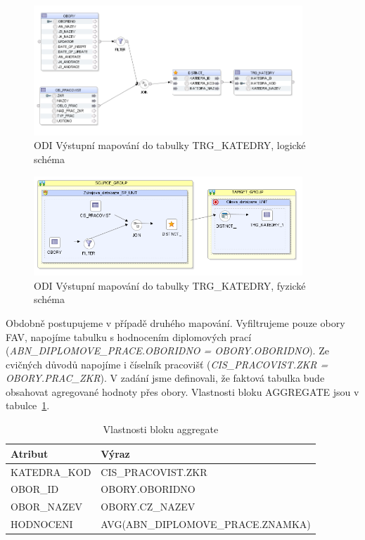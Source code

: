 \begin{figure}[htb]
    \centering
    \includegraphics[width=0.9\textwidth]{graphs/odi-mapping-trg-katedry.png}
    \caption{ODI Výstupní mapování do tabulky TRG\_KATEDRY, logické schéma}
    \label{fig:odi-mapping-trg-katedry}
\end{figure}
\FloatBarrier

\begin{figure}[htb]
    \centering
    \includegraphics[width=0.9\textwidth]{graphs/odi-mapping-trg-katedry-physical.png}
    \caption{ODI Výstupní mapování do tabulky TRG\_KATEDRY, fyzické schéma}
    \label{fig:odi-mapping-trg-katedry-physical}
\end{figure}
\FloatBarrier

Obdobně postupujeme v případě druhého mapování.
Vyfiltrujeme pouze obory FAV, napojíme tabulku s hodnocením diplomových prací (\textit{ABN\_DIPLOMOVE\_PRACE.OBORIDNO = OBORY.OBORIDNO}).
Ze cvičných důvodů napojíme i číselník pracovišť (\textit{CIS\_PRACOVIST.ZKR = OBORY.PRAC\_ZKR}).
V zadání jsme definovali, že faktová tabulka bude obsahovat agregované hodnoty přes obory.
Vlastnosti bloku AGGREGATE jsou v tabulce~\ref{table:table4}.

\begin{table}[htb]
    \centering

    \begin{tabular}{ll}
        \toprule

        Atribut         & Výraz                             \\ \midrule
        KATEDRA\_KOD    & CIS\_PRACOVIST.ZKR                \\
        OBOR\_ID        & OBORY.OBORIDNO                    \\
        OBOR\_NAZEV     & OBORY.CZ\_NAZEV                   \\
        HODNOCENI       & AVG(ABN\_DIPLOMOVE\_PRACE.ZNAMKA) \\
          
        \bottomrule
    \end{tabular}

    \caption{Vlastnosti bloku aggregate}
    \label{table:table4}
\end{table}
\FloatBarrier

